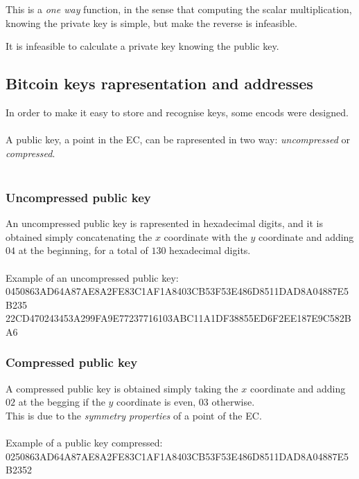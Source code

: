 This is a \textit{one way} function, in the sense that computing the scalar multiplication, knowing the private key is simple, but make the reverse is infeasible.
\begin{remark}
	It is infeasible to calculate a private key knowing the public key.
\end{remark}


\subsection{Bitcoin keys rapresentation and addresses}
In order to make it easy to store and recognise keys, some encods were designed.
\\ \\
A public key, a point in the EC, can be rapresented in two way: \textit{uncompressed} or \textit{compressed}.\\ \\
\subsubsection{Uncompressed public key}
An uncompressed public key is rapresented in hexadecimal digits, and it is obtained simply concatenating the $x$ coordinate with the $y$ coordinate and adding $04$ at the beginning, for a total of $130$ hexadecimal digits. \\ \\
Example of an uncompressed public key: \\
0450863AD64A87AE8A2FE83C1AF1A8403CB53F53E486D8511DAD8A04887E5B235 22CD470243453A299FA9E77237716103ABC11A1DF38855ED6F2EE187E9C582BA6


\subsubsection{Compressed public key}
A compressed public key is obtained simply taking the $x$ coordinate and adding $02$ at the begging if the $y$ coordinate is even, $03$ otherwise. \\
This is due to the \textit{symmetry properties} of a point of the EC.
\\ \\
Example of a public key compressed:\\
0250863AD64A87AE8A2FE83C1AF1A8403CB53F53E486D8511DAD8A04887E5B2352


